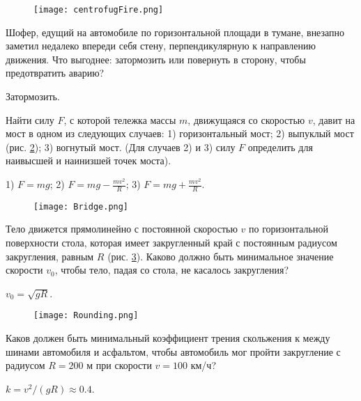 \begin{figure}
\centering
\texttt{[image: centrofugFire.png]}
\caption{}
\label{centrofugFire}
\end{figure}

\begin{ex} %
Шофер, едущий на автомобиле по горизонтальной площади в тумане, внезапно заметил недалеко впереди себя стену, перпендикулярную к направлению движения. Что выгоднее: затормозить или повернуть в сторону, чтобы предотвратить аварию?
\begin{ans}
Затормозить.
\end{ans}
\end{ex}	

\simpleProblems

\begin{ex} %
Найти силу $F$, с которой тележка массы $m$, движущаяся со скоростью $v$, давит на мост в одном из следующих случаев: 1) горизонтальный мост; 2) выпуклый мост (рис. \ref{Bridge}); 3) вогнутый мост. (Для случаев 2) и 3) силу $F$ определить для наивысшей и наинизшей точек моста).
\begin{ans}
1) $F=mg$; 2) $F=mg-\frac{mv^2}{R}$; 3) $F=mg+\frac{mv^2}{R}$.
\end{ans}
\end{ex}	

\begin{figure}[h]
\centering
\texttt{[image: Bridge.png]}
\caption{}
\label{Bridge}
\end{figure}

\begin{ex} %
Тело движется прямолинейно с постоянной скоростью $v$ по горизонтальной поверхности стола, которая имеет закругленный край с постоянным радиусом закругления, равным $R$ (рис. \ref{Rounding}). Каково должно быть минимальное значение скорости $v_0$, чтобы тело, падая со стола, не касалось закругления?
\begin{ans}
$v_0 = \sqrt{gR}$.
\end{ans}
\end{ex}	

\begin{figure}[h]
\centering
\texttt{[image: Rounding.png]}
\caption{}
\label{Rounding}
\end{figure}

\begin{ex}  %
Каков должен быть минимальный коэффициент трения скольжения к между шинами автомобиля и асфальтом, чтобы автомобиль мог пройти закругление с радиусом $R = 200$ м при скорости $v = 100$ км/ч?
\begin{ans}
$k=v^2/(gR) \approx 0.4$.
\end{ans}
\end{ex}	

